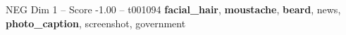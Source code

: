 \begin{textsample}{NEG Dim 1 – Score -1.00 – t001094}  \label{ex:f1_neg_037}
\textbf{facial\_hair}, \textbf{moustache}, \textbf{beard}, news, \textbf{photo\_caption}, screenshot, government

\end{textsample}
